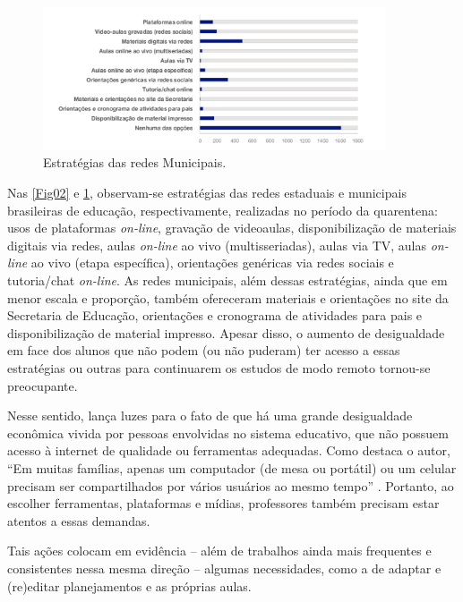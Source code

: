 \documentclass{textolivre}
\begin{document}
\begin{figure}[htbp]
 \centering
 \includegraphics[width=0.90\textwidth]{Fig03}
 \caption{Estratégias das redes Municipais.}
 \label{Fig03}
\end{figure}

Nas \cref{Fig02} e \cref{Fig03}, observam-se estratégias das redes estaduais e municipais brasileiras de educação, respectivamente, realizadas no período da quarentena: usos de plataformas \textit{on-line}, gravação de videoaulas, disponibilização de materiais digitais via redes, aulas \textit{on-line} ao vivo (multisseriadas), aulas via TV, aulas \textit{on-line} ao vivo (etapa específica), orientações genéricas via redes sociais e tutoria/chat \textit{on-line}. As redes municipais, além dessas estratégias, ainda que em menor escala e proporção, também ofereceram materiais e orientações no site da Secretaria de Educação, orientações e cronograma de atividades para pais e disponibilização de material impresso. Apesar disso, o aumento de desigualdade em face dos alunos que não podem (ou não puderam) ter acesso a essas estratégias ou outras para continuarem os estudos de modo remoto tornou-se preocupante. 

Nesse sentido, \textcite{bunzen_o_2020} lança luzes para o fato de que há uma grande desigualdade econômica vivida por pessoas envolvidas no sistema educativo, que não possuem acesso à internet de qualidade ou ferramentas adequadas. Como destaca o autor, “Em muitas famílias, apenas um computador (de mesa ou portátil) ou um celular precisam ser compartilhados por vários usuários ao mesmo tempo” \cite[p. 24]{bunzen_o_2020}. Portanto, ao escolher ferramentas, plataformas e mídias, professores também precisam estar atentos a essas demandas.

Tais ações colocam em evidência – além de trabalhos ainda mais frequentes e consistentes nessa mesma direção – algumas necessidades, como a de adaptar e (re)editar planejamentos e as próprias aulas.
\end{document}

